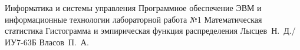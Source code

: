 \documentclass{bmstu}
\begin{document}
\makereporttitle
{Информатика и системы управления} %
{Программное обеспечение ЭВМ и информационные технологии}
{лабораторной работа №1} %
{Математическая статистика} %
{Гистограмма и эмпирическая функция распределения} %
{} %
{Лысцев~Н.~Д./ИУ7-63Б} %
{Власов~П.~А.} %
{}

\maketableofcontents



%


%

\end{document}
